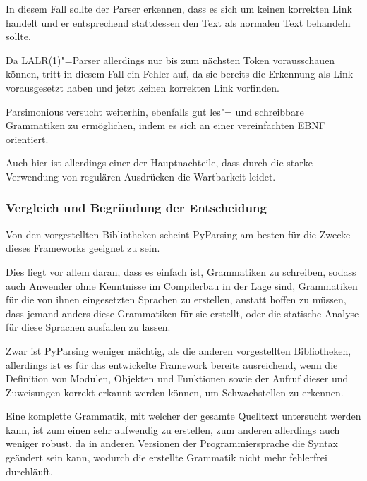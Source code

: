                 In diesem Fall sollte der Parser erkennen,
                dass es sich um keinen korrekten Link handelt und
                er entsprechend stattdessen den Text als normalen Text behandeln sollte.

                Da
                \gls{LALR(1)}"=Parser allerdings nur bis zum nächsten Token vorausschauen können,
                tritt in diesem Fall ein Fehler auf,
                da sie bereits die Erkennung als Link vorausgesetzt haben und
                jetzt keinen korrekten Link vorfinden.

                Parsimonious versucht weiterhin,
                ebenfalls gut les"= und
                schreibbare Grammatiken zu ermöglichen,
                indem es sich an einer vereinfachten
                \gls{EBNF} orientiert.

                Auch hier ist allerdings einer der Hauptnachteile,
                dass durch die starke Verwendung von regulären Ausdrücken die Wartbarkeit leidet.

            \subsubsection{Vergleich und Begründung der Entscheidung}\label{Vergleich und Begruendung der Entscheidung}
                Von den vorgestellten Bibliotheken scheint PyParsing am besten für die Zwecke dieses Frameworks geeignet zu sein.

                Dies liegt vor allem daran,
                dass es einfach ist,
                Grammatiken zu schreiben,
                sodass auch Anwender ohne Kenntnisse im Compilerbau in der Lage sind,
                Grammatiken für die von ihnen eingesetzten Sprachen zu erstellen,
                anstatt hoffen zu müssen,
                dass jemand anders diese Grammatiken für sie erstellt,
                oder
                die statische Analyse für diese Sprachen ausfallen zu lassen.

                Zwar ist PyParsing weniger mächtig,
                als die anderen vorgestellten Bibliotheken,
                allerdings ist es für das entwickelte Framework bereits ausreichend,
                wenn die Definition von Modulen,
                Objekten und
                Funktionen sowie
                der Aufruf dieser und
                Zuweisungen korrekt erkannt werden können,
                um Schwachstellen zu erkennen.

                Eine komplette Grammatik,
                mit welcher der gesamte Quelltext untersucht werden kann,
                ist zum einen sehr aufwendig zu erstellen,
                zum anderen allerdings auch weniger robust,
                da in anderen Versionen der Programmiersprache die Syntax geändert sein kann,
                wodurch die erstellte Grammatik nicht mehr fehlerfrei durchläuft.

